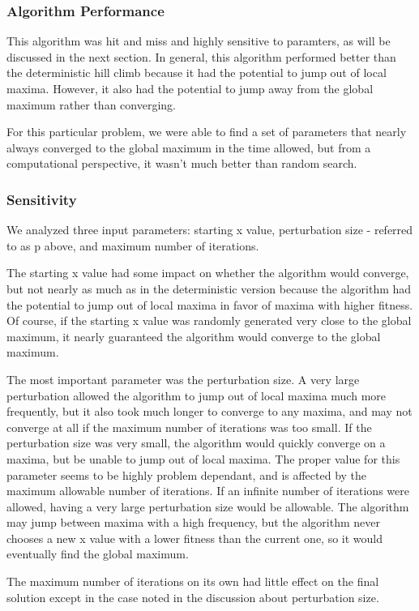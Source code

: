 \subsubsection{Algorithm Performance}
This algorithm was hit and miss and highly sensitive to paramters, as will be discussed in the next section. In general, this algorithm performed better than the deterministic hill climb because it had the potential to jump out of local maxima. However, it also had the potential to jump away from the global maximum rather than converging.

For this particular problem, we were able to find a set of parameters that nearly always converged to the global maximum in the time allowed, but from a computational perspective, it wasn't much better than random search.

\subsubsection{Sensitivity}
We analyzed three input parameters: starting x value, perturbation size - referred to as p above, and maximum number of iterations.

The starting x value had some impact on whether the algorithm would converge, but not nearly as much as in the deterministic version because the algorithm had the potential to jump out of local maxima in favor of maxima with higher fitness. Of course, if the starting x value was randomly generated very close to the global maximum, it nearly guaranteed the algorithm would converge to the global maximum.

The most important parameter was the perturbation size. A very large perturbation allowed the algorithm to jump out of local maxima much more frequently, but it also took much longer to converge to any maxima, and may not converge at all if the maximum number of iterations was too small. If the perturbation size was very small, the algorithm would quickly converge on a maxima, but be unable to jump out of local maxima. The proper value for this parameter seems to be highly problem dependant, and is affected by the maximum allowable number of iterations. If an infinite number of iterations were allowed, having a very large perturbation size would be allowable. The algorithm may jump between maxima with a high frequency, but the algorithm never chooses a new x value with a lower fitness than the current one, so it would eventually find the global maximum.

The maximum number of iterations on its own had little effect on the final solution except in the case noted in the discussion about perturbation size.

